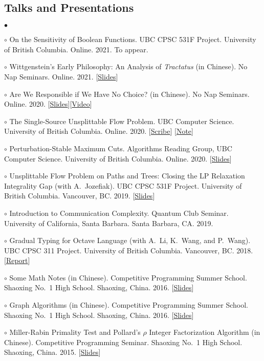 \documentclass[margin,line]{res}
\newenvironment{list2}{
  \begin{list}{$\bullet$}{%
      \setlength{\itemsep}{0in}
      \setlength{\parsep}{0in} \setlength{\parskip}{0in}
      \setlength{\topsep}{0in} \setlength{\partopsep}{0in}
      \setlength{\leftmargin}{0.2in}}}{\end{list}}
\begin{document}
\begin{resume}
\section{\sc Talks and Presentations}

\begin{list2}
\item[$\circ$] On the Sensitivity of Boolean Functions. UBC CPSC 531F Project. University of British Columbia. Online. 2021. To appear.
\item[$\circ$] Wittgenstein's Early Philosophy: An Analysis of \emph{Tractatus} (in Chinese). No Nap Seminars. Online. 2021. [\href{https://ypan.me/docs/tractatus.pdf}{Slides}]
\item[$\circ$] Are We Responsible if We Have No Choice? (in Chinese). No Nap Seminars. Online. 2020. [\href{https://ypan.me/docs/pap.pdf}{Slides}][\href{https://www.youtube.com/watch?v=xYKlstE4aBs}{Video}]
\item[$\circ$] The Single-Source Unsplittable Flow Problem. UBC Computer Science. University of British Columbia. Online. 2020. [\href{https://ypan.me/docs/ssufp-scribe.pdf}{Scribe}] [\href{https://ypan.me/docs/ssufp-note.pdf}{Note}]
\item[$\circ$] Perturbation-Stable Maximum Cuts. Algorithms Reading Group, UBC Computer Science. University of British Columbia. Online. 2020. [\href{https://ypan.me/docs/maxcut.pdf}{Slides}]
\item[$\circ$] Unsplittable Flow Problem on Paths and Trees: Closing the LP Relaxation Integrality Gap (with A.\ Jozefiak). UBC CPSC 531F Project. University of British Columbia. Vancouver, BC. 2019. [\href{https://ypan.me/docs/ufp-slides.pdf}{Slides}]
\item[$\circ$] Introduction to Communication Complexity. Quantum Club Seminar. University of California, Santa Barbara. Santa Barbara, CA. 2019.
\item[$\circ$] Gradual Typing for Octave Language (with A.\ Li, K.\ Wang, and P.\ Wang). UBC CPSC 311 Project. University of British Columbia. Vancouver, BC. 2018. [\href{https://ypan.me/docs/gradual-octave.pdf}{Report}]
\item[$\circ$] Some Math Notes (in Chinese). Competitive Programming Summer School. Shaoxing No.\ 1 High School. Shaoxing, China. 2016. [\href{https://ypan.me/docs/math.pdf}{Slides}]
\item[$\circ$] Graph Algorithms (in Chinese). Competitive Programming Summer School. Shaoxing No.\ 1 High School. Shaoxing, China. 2016. [\href{https://ypan.me/docs/graph.pdf}{Slides}]
\item[$\circ$] Miller-Rabin Primality Test and Pollard's $\rho$ Integer Factorization Algorithm (in Chinese). Competitive Programming Seminar. Shaoxing No.\ 1 High School. Shaoxing, China. 2015. [\href{https://ypan.me/docs/miller-rabin-pollard-rho.pdf}{Slides}]
\end{list2}



\end{resume}
\end{document}

